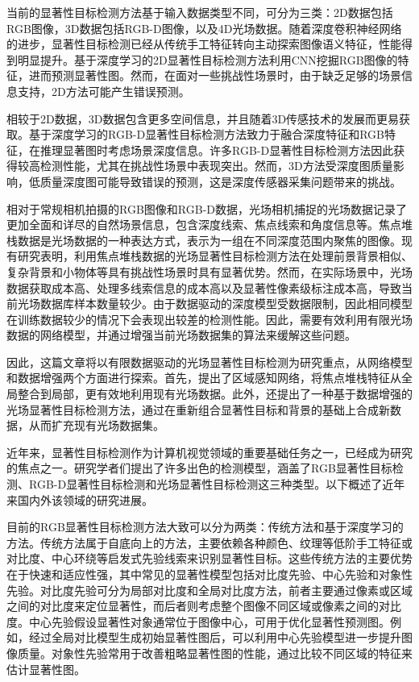 当前的显著性目标检测方法基于输入数据类型不同，可分为三类：2D数据包括RGB图像，3D数据包括RGB-D图像，以及4D光场数据。随着深度卷积神经网络的进步，显著性目标检测已经从传统手工特征转向主动探索图像语义特征，性能得到明显提升。基于深度学习的2D显著性目标检测方法利用CNN挖掘RGB图像的特征，进而预测显著性图。然而，在面对一些挑战性场景时，由于缺乏足够的场景信息支持，2D方法可能产生错误预测。

相较于2D数据，3D数据包含更多空间信息，并且随着3D传感技术的发展而更易获取。基于深度学习的RGB-D显著性目标检测方法致力于融合深度特征和RGB特征，在推理显著图时考虑场景深度信息。许多RGB-D显著性目标检测方法因此获得较高检测性能，尤其在挑战性场景中表现突出。然而，3D方法受深度图质量影响，低质量深度图可能导致错误的预测，这是深度传感器采集问题带来的挑战。

相对于常规相机拍摄的RGB图像和RGB-D数据，光场相机捕捉的光场数据记录了更加全面和详尽的自然场景信息，包含深度线索、焦点线索和角度信息等。焦点堆栈数据是光场数据的一种表达方式，表示为一组在不同深度范围内聚焦的图像。现有研究表明，利用焦点堆栈数据的光场显著性目标检测方法在处理前景背景相似、复杂背景和小物体等具有挑战性场景时具有显著优势。然而，在实际场景中，光场数据获取成本高、处理多线索信息的成本高以及显著性像素级标注成本高，导致当前光场数据库样本数量较少。由于数据驱动的深度模型受数据限制，因此相同模型在训练数据较少的情况下会表现出较差的检测性能。因此，需要有效利用有限光场数据的网络模型，并通过增强当前光场数据集的算法来缓解这些问题。

因此，这篇文章将以有限数据驱动的光场显著性目标检测为研究重点，从网络模型和数据增强两个方面进行探索。首先，提出了区域感知网络，将焦点堆栈特征从全局整合到局部，更有效地利用现有光场数据。此外，还提出了一种基于数据增强的光场显著性目标检测方法，通过在重新组合显著性目标和背景的基础上合成新数据，从而扩充现有光场数据集。



近年来，显著性目标检测作为计算机视觉领域的重要基础任务之一，已经成为研究的焦点之一。研究学者们提出了许多出色的检测模型，涵盖了RGB显著性目标检测、RGB-D显著性目标检测和光场显著性目标检测这三种类型。以下概述了近年来国内外该领域的研究进展。



目前的RGB显著性目标检测方法大致可以分为两类：传统方法和基于深度学习的方法。传统方法属于自底向上的方法，主要依赖各种颜色、纹理等低阶手工特征或对比度、中心环绕等启发式先验线索来识别显著性目标。这些传统方法的主要优势在于快速和适应性强，其中常见的显著性模型包括对比度先验、中心先验和对象性先验。对比度先验可分为局部对比度和全局对比度方法，前者主要通过像素或区域之间的对比度来定位显著性，而后者则考虑整个图像不同区域或像素之间的对比度。中心先验假设显著性对象通常位于图像中心，可用于优化显著性预测图。例如，经过全局对比模型生成初始显著性图后，可以利用中心先验模型进一步提升图像质量。对象性先验常用于改善粗略显著性图的性能，通过比较不同区域的特征来估计显著性图。


